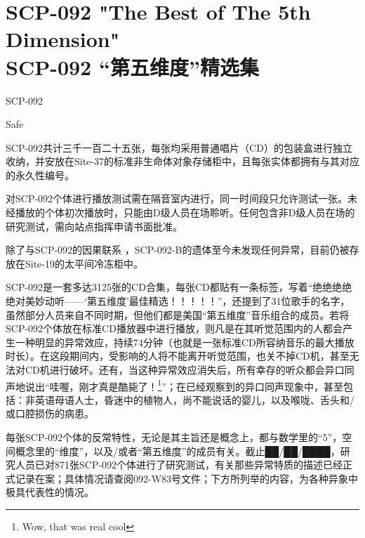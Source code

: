 \chapter[SCP-092 “第五维度”精选集]{
    SCP-092 "The Best of The 5th Dimension"\\
    SCP-092 “第五维度”精选集
}

\label{chap:SCP-092}

SCP-092

Safe

SCP-092共计三千一百二十五张，每张均采用普通唱片（CD）的包装盒进行独立收纳，并安放在Site-37的标准非生命体对象存储柜中，且每张实体都拥有与其对应的永久性编号。

对SCP-092个体进行播放测试需在隔音室内进行，同一时间段只允许测试一张。未经播放的个体初次播放时，只能由D级人员在场聆听。任何包含非D级人员在场的研究测试，需向站点指挥申请书面批准。

除了与SCP-092的因果联系 ，SCP-092-B的遗体至今未发现任何异常，目前仍被存放在Site-19的太平间冷冻柜中。

SCP-092是一套多达3125张的CD合集，每张CD都贴有一条标签，写着“绝绝绝绝绝对美妙动听——‘第五维度’最佳精选！！！！！”，还提到了31位歌手的名字，虽然部分人员来自不同时期，但他们都是美国“第五维度”音乐组合的成员。若将SCP-092个体放在标准CD播放器中进行播放，则凡是在其听觉范围内的人都会产生一种明显的异常效应，持续74分钟（也就是一张标准CD所容纳音乐的最大播放时长）。在这段期间内，受影响的人将不能离开听觉范围，也关不掉CD机，甚至无法对CD机进行破坏。还有，当这种异常效应消失后，所有幸存的听众都会异口同声地说出“哇喔，刚才真是酷毙了！\footnote{Wow, that was real cool}”；在已经观察到的异口同声现象中，甚至包括：非英语母语人士，昏迷中的植物人，尚不能说话的婴儿，以及喉咙、舌头和\slash 或口腔损伤的病患。

每张SCP-092个体的反常特性，无论是其主旨还是概念上，都与数学里的“5”，空间概念里的“维度”，以及\slash 或者“第五维度”的成员有关。截止██\slash ██\slash ████，研究人员已对871张SCP-092个体进行了研究测试，有关那些异常特质的描述已经正式记录在案；具体情况请查阅092-W83号文件；下方所列举的内容，为各种异象中极具代表性的情况。



